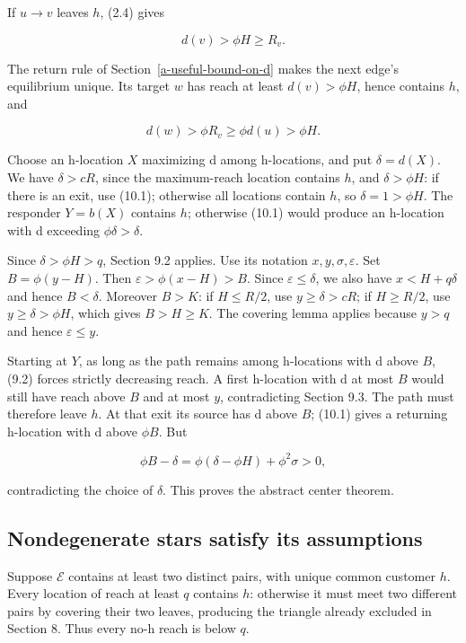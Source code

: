 \documentclass[11pt,a4paper]{article}
\begin{document}
If \(u\to v\) leaves \(h\), (2.4) gives

\[
d(v)>\phi H\ge R_v.
\]

The return rule of Section~\ref{a-useful-bound-on-d} makes the next edge's equilibrium unique. Its target \(w\) has reach at least \(d(v)>\phi H\), hence contains \(h\), and

\[
d(w)>\phi R_v\ge\phi d(u)>\phi H. \tag{10.1}
\]

Choose an h-location \(X\) maximizing d among h-locations, and put \(\delta=d(X)\). We have \(\delta>cR\), since the maximum-reach location contains \(h\), and \(\delta>\phi H\): if there is an exit, use (10.1); otherwise all locations contain \(h\), so \(\delta=1>\phi H\). The responder \(Y=b(X)\) contains \(h\); otherwise (10.1) would produce an h-location with d exceeding \(\phi\delta>\delta\).

Since \(\delta>\phi H>q\), Section 9.2 applies. Use its notation \(x,y,\sigma,\varepsilon\). Set \(B=\phi(y-H)\). Then \(\varepsilon>\phi(x-H)>B\). Since \(\varepsilon\le\delta\), we also have \(x<H+q\delta\) and hence \(B<\delta\). Moreover \(B>K\): if \(H\le R/2\), use \(y\ge\delta>cR\); if \(H\ge R/2\), use \(y\ge\delta>\phi H\), which gives \(B>H\ge K\). The covering lemma applies because \(y>q\) and hence \(\varepsilon\le y\).

Starting at \(Y\), as long as the path remains among h-locations with d above \(B\), (9.2) forces strictly decreasing reach. A first h-location with d at most \(B\) would still have reach above \(B\) and at most \(y\), contradicting Section 9.3. The path must therefore leave \(h\). At that exit its source has d above \(B\); (10.1) gives a returning h-location with d above \(\phi B\). But

\[
\phi B-\delta
=\phi(\delta-\phi H)+\phi^2\sigma>0,
\]

contradicting the choice of \(\delta\). This proves the abstract center theorem.

\hypertarget{nondegenerate-stars-satisfy-its-assumptions}{%
\subsection{Nondegenerate stars satisfy its assumptions}\label{nondegenerate-stars-satisfy-its-assumptions}}

Suppose \(\mathcal E\) contains at least two distinct pairs, with unique common customer \(h\). Every location of reach at least \(q\) contains \(h\): otherwise it must meet two different pairs by covering their two leaves, producing the triangle already excluded in Section 8. Thus every no-h reach is below \(q\).
\end{document}
